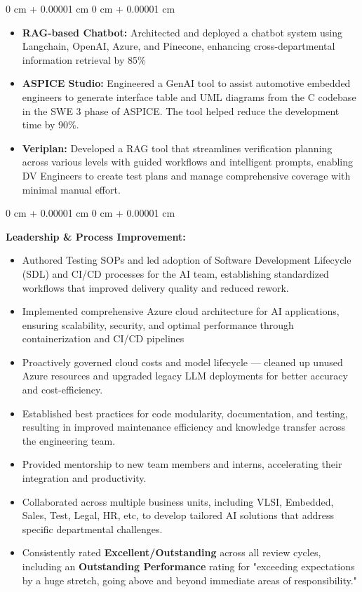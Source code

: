 \documentclass[10pt, letterpaper]{article}
\newenvironment{highlights}{
    \begin{itemize}[
        topsep=0.10 cm,
        parsep=0.10 cm,
        partopsep=0pt,
        itemsep=0pt,
        leftmargin=0 cm + 10pt
    ]
}{
    \end{itemize}
} %
\newenvironment{onecolentry}{
    \begin{adjustwidth}{
        0 cm + 0.00001 cm
    }{
        0 cm + 0.00001 cm
    }
}{
    \end{adjustwidth}
} %
\begin{document}
\begin{onecolentry}
\begin{highlights}
                \item \textbf{RAG-based Chatbot:} Architected and deployed a chatbot system using Langchain, OpenAI, Azure, and Pinecone, enhancing cross-departmental information retrieval by 85\%
                \item \textbf{ASPICE Studio:} Engineered a GenAI tool to assist automotive embedded engineers to generate interface table and UML diagrams from the C codebase in the SWE 3 phase of ASPICE. The tool helped reduce the development time by 90\%.
                \item \textbf{Veriplan:} Developed a RAG tool that streamlines verification planning across various levels with guided workflows and intelligent prompts, enabling DV Engineers to create test plans and manage comprehensive coverage with minimal manual effort.
            \end{highlights}
        \end{onecolentry}
        
        \vspace{0.15 cm}
        \begin{onecolentry}
        \textbf{Leadership \& Process Improvement:}
            \begin{highlights}
                \item Authored Testing SOPs and led adoption of Software Development Lifecycle (SDL) and CI/CD processes for the AI team, establishing standardized workflows that improved delivery quality and reduced rework.
                \item Implemented comprehensive Azure cloud architecture for AI applications, ensuring scalability, security, and optimal performance through containerization and CI/CD pipelines
                \item Proactively governed cloud costs and model lifecycle — cleaned up unused Azure resources and upgraded legacy LLM deployments for better accuracy and cost-efficiency.
                \item Established best practices for code modularity, documentation, and testing, resulting in improved maintenance efficiency and knowledge transfer across the engineering team.
                \item Provided mentorship to new team members and interns, accelerating their integration and productivity.
                \item Collaborated across multiple business units, including VLSI, Embedded, Sales, Test, Legal, HR, etc, to develop tailored AI solutions that address specific departmental challenges.
                \item Consistently rated {\textbf{Excellent/Outstanding}} across all review cycles, including an {\textbf{Outstanding Performance}} rating for "exceeding expectations by a huge stretch, going above and beyond immediate areas of responsibility."
            \end{highlights}
        \end{onecolentry}
\end{document}
